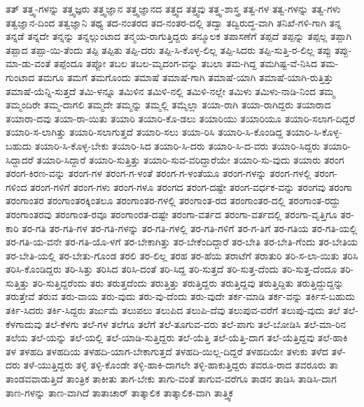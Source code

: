 {ತತ್
ತತ್ತ್ವ-ಗಳನ್ನು
ತತ್ತ್ವಜ್ಞರು
ತತ್ತ್ವಜ್ಞಾನ
ತತ್ತ್ವಜ್ಞಾನದ
ತತ್ತ್ವದ
ತತ್ತ್ವವು
ತತ್ತ್ವ-ಶಾಸ್ತ್ರ
ತತ್ವ-ಗಳ
ತತ್ವ-ಗಳನ್ನು
ತತ್ವ-ಗಳು
ತತ್ವಜ್ಞಾನ-ದಿಂದ
ತತ್ವಜ್ಞಾನಿ
ತಥ್ಯ
ತದ-ನಂತರದ
ತದ-ನಂತರ-ದಲ್ಲಿ
ತದ್ವಾ
ತದ್ವಿರುದ್ಧ-ವಾಗಿ
ತನಿಖೆ-ಗಳಿ-ಗಾಗಿ
ತನ್ನ
ತನ್ನಡೆ
ತನ್ನದೇ
ತನ್ನನ್ನು
ತನ್ನಲ್ಲುಂಟಾದ
ತನ್ಮಯ-ರಾಗುತ್ತಿದ್ದರು
ತನ್ಮೂಲಕ
ತಪಾಸಣೆಗೆ
ತಪ್ಪದೆ
ತಪ್ಪನ್ನು
ತಪ್ಪಲ್ಲ
ತಪ್ಪಾಗಿ
ತಪ್ಪಾದ
ತಪ್ಪಾ-ಯಿ-ತೆಂದು
ತಪ್ಪಿ
ತಪ್ಪಿತು
ತಪ್ಪಿ-ದರು
ತಪ್ಪಿ-ಸಿ-ಕೊಳ್ಳ-ಲಿಲ್ಲ
ತಪ್ಪಿ-ಸಿದರು
ತಪ್ಪಿ-ಸುತ್ತಿ-ರ-ಲಿಲ್ಲ
ತಪ್ಪು
ತಪ್ಪು-ಮಾ-ಡು-ವಂತೆ
ತಪ್ಪೆಂದೂ
ತಪ್ಪೋ
ತಬಲ
ತಬಲ-ಮೃದಂಗ-ವನ್ನು
ತಬಲಾ
ತಮ-ಗಿದ್ದ
ತಮಗಿಷ್ಟ-ವೆ-ನಿಸಿದ
ತಮ-ಗುಂಟಾದ
ತಮಗೂ
ತಮಗೆ
ತಮಗೊಂದು
ತಮಾಷೆ
ತಮಾಷೆ-ಗಾಗಿ
ತಮಾಷೆ-ಯಾಗಿ
ತಮಾಷೆ-ಯಾಗಿ-ರುತ್ತಿತ್ತು
ತಮಾಷೆ-ಯೆನ್ನಿ-ಸುತ್ತದೆ
ತಮಿ-ಳನ್ನೂ
ತಮಿಳಿನ
ತಮಿಳಿ-ನಲ್ಲಿ
ತಮಿಳಿ-ನಲ್ಲೇ
ತಮಿಳು
ತಮಿಳು-ನಾಡಿ-ನಿಂದ
ತಮ್ಮ
ತಮ್ಮಂದಿರೇ
ತಮ್ಮ-ದಾಗಲಿ
ತಮ್ಮದೇ
ತಮ್ಮನ್ನು
ತಮ್ಮಲ್ಲಿ
ತಮ್ಮೆಲ್ಲಾ
ತಯಾ-ರಾಗಿ
ತಯಾ-ರಾಗಿದ್ದರು
ತಯಾರಾದ
ತಯಾರಾ-ದವು
ತಯಾ-ರಾ-ಯಿತು
ತಯಾರಿ
ತಯಾರಿ-ಕೊ-ಡಲು
ತಯಾರಿಯು
ತಯಾರಿಯೂ
ತಯಾರಿ-ಸಲಾಗ-ದಿದ್ದರೆ
ತಯಾರಿ-ಸ-ಲಾಗಿತ್ತು
ತಯಾರಿ-ಸಲಾಗುತ್ತದೆ
ತಯಾರಿ-ಸಲು
ತಯಾ-ರಿಸಿ
ತಯಾರಿ-ಸಿ-ಕೊಂಡಿದ್ದ
ತಯಾರಿ-ಸಿ-ಕೊಳ್ಳ-ಬಹುದು
ತಯಾರಿ-ಸಿ-ಕೊಳ್ಳ-ಬೇಕು
ತಯಾರಿ-ಸಿದ
ತಯಾರಿ-ಸಿ-ದರು
ತಯಾರಿ-ಸಿ-ದ-ವರು
ತಯಾರಿ-ಸಿದ್ದರು
ತಯಾರಿ-ಸಿದ್ದಾದರೆ
ತಯಾರಿ-ಸಿದ್ದಾರೆ
ತಯಾರಿ-ಸುತ್ತಿತ್ತು
ತಯಾರಿ-ಸುವ-ವರಿದ್ದಾರೆಯೇ
ತಯಾರಿ-ಸು-ವುದು
ತಯಾರು
ತರಂಗ
ತರಂಗ-ಕಿರಣ-ವನ್ನು
ತರಂಗ-ಗಳ
ತರಂಗ-ಗ-ಳಂತೆ
ತರಂಗ-ಗ-ಳಂತೆಯೂ
ತರಂಗ-ಗಳನ್ನು
ತರಂಗ-ಗಳಲ್ಲಿ
ತರಂಗ-ಗಳಿಂದ
ತರಂಗ-ಗಳಿಗೆ
ತರಂಗ-ಗಳು
ತರಂಗ-ಗಳೂ
ತರಂಗದ
ತರಂಗ-ದಷ್ಟೇ
ತರಂಗ-ವರ್ಧಕ-ವನ್ನು
ತರಂಗವು
ತರಂಗಾ
ತರಂಗಾಂತರ
ತರಂಗಾಂತರಕ್ಕಿಂತಲೂ
ತರಂಗಾಂತರ-ಗಳಲ್ಲಿ
ತರಂಗಾಂತ-ರದ
ತರಂಗಾಂತರ-ದಲ್ಲಿ
ತರಂಗಾಂತ-ರದ್ದು
ತರಂಗಾಂತರವು
ತರಂಗಾಂತ-ರವೂ
ತರಂಗಾಂರತ-ದಷ್ಟೇ
ತರಂಗಾ-ವರ್ತದ
ತರಂಗಾ-ವರ್ತದಲ್ಲಿ
ತರಂಗಾ-ವೃತ್ತಿಗೂ
ತರ-ಕಾರಿ
ತರ-ಗತಿ
ತರ-ಗತಿ-ಗಳ
ತರ-ಗತಿ-ಗಳನ್ನು
ತರ-ಗತಿ-ಗಳಲ್ಲಿ
ತರ-ಗತಿ-ಗಳಿಗೆ
ತರ-ಗ-ತಿಗೆ
ತರ-ಗತಿಯ
ತರ-ಗತಿ-ಯಲ್ಲಿ
ತರ-ಗತಿ-ಯ-ವನೇ
ತರ-ಗತಿ-ಯೊ-ಳಗೆ
ತರ-ಬೇಕಾಗಿತ್ತು
ತರ-ಬೇಕೆಂದಿದ್ದಾರೆ
ತರ-ಬೇತಿ
ತರ-ಬೇತಿ-ಗೆಂದು
ತರ-ಬೇತಿಯ
ತರ-ಬೇತಿ-ಯಲ್ಲಿ
ತರ-ಬೇತು-ಗೊಂಡ
ತರಲಿ
ತರ-ಲಿಲ್ಲ
ತರಹ
ತರ-ಹೆಯ
ತರಾಟೆಗೆ
ತರಾತುರಿ
ತರಿ-ಸ-ಲಾ-ಯಿತು
ತರಿಸಿ
ತರಿಸಿ-ಕೊಂಡಿದ್ದರು
ತರಿ-ಸಿತ್ತು
ತರಿಸಿದ
ತರಿಸಿ-ದಂತೆ
ತರಿ-ಸಿದ್ದ
ತರಿ-ಸುತ್ತದೆ
ತರಿ-ಸುತ್ತ-ದೆಂದು
ತರಿ-ಸುತ್ತ-ದೆಂದೂ
ತರಿ-ಸುತ್ತಿತ್ತು
ತರಿ-ಸುತ್ತಿದ್ದರೆಂದು
ತರು
ತರುತ್ತದೆಂದು
ತರುತ್ತಿತ್ತು
ತರುತ್ತಿದ್ದರು
ತರುತ್ತಿದ್ದವು
ತರುತ್ತಿದ್ದಿತು
ತರುತ್ತಿದ್ದುದ್ದನ್ನು
ತರುತ್ತೇವೆ
ತರುವ
ತರು-ವಾಯ
ತರು-ವುದು
ತರು-ವು-ದೆಂದು
ತರು-ವುದೇ
ತರ್ಕ-ಮಾಡಿ
ತರ್ಕ-ವನ್ನು
ತರ್ಕಿಸ-ಬಹುದು
ತರ್ಕಿ-ಸಿದರು
ತರ್ಕಿ-ಸಿದ್ದರು
ತರ್ಜುಮೆ
ತಲುಪಲು
ತಲುಪಿದ
ತಲುಪಿ-ದೆವು
ತಲುಪುವ-ವರೆಗೆ
ತಲುಪು-ವುದು
ತಲೆ
ತಲೆ-ಕೆಳಗಾದುವು
ತಲೆ-ಕೆಳಗು
ತಲೆ-ಗಳ
ತಲೆಗೂ
ತಲೆಗೆ
ತಲೆ-ತೂಗುವ-ವರು
ತಲೆ-ಪಾಗು
ತಲೆ-ಬೋಡಿಸಿ
ತಲೆ-ಮಾ-ರಿನ
ತಲೆಯ
ತಲೆ-ಯನ್ನು
ತಲೆ-ಯಲ್ಲಿ
ತಲೆ-ಯಾಡಿ-ಸುತ್ತಿದ್ದರು
ತಲೆ-ಯೆತ್ತಿ
ತಲೆ-ಯೆತ್ತಿ-ದಾಗ
ತಲೆ-ಯೆತ್ತಿದ್ದವು
ತಲೆ-ಹಾಕಿ
ತಳ
ತಳಹದಿ
ತಳಹದಿಯ
ತಳಹದಿ-ಯಾಗ-ಬೇಕಾಗುತ್ತದೆ
ತಳಹದಿ-ಯಿಲ್ಲ-ದಿದ್ದರೆ
ತಳಹದಿಯೇ
ತಳುಕು
ತಳೆದ
ತಳೆ-ದರು
ತಳೆ-ಯುತ್ತಿದ್ದರು
ತಳ್ಳಿ
ತಳ್ಳಿ-ಕೊಂಡೇ
ತಳ್ಳಿ-ಹಾಕಿ-ದಾಗಲೇ
ತಳ್ಳಿ-ಹಾಕುತ್ತಿದ್ದರು
ತವರೂ-ರಾದ
ತವರೂರು
ತಾ
ತಾಂಡವವಾಡುತ್ತಿದೆ
ತಾಂತ್ರಿಕ
ತಾಕೀತು
ತಾಗ-ಬೇಕು
ತಾಗು-ವಂತೆ
ತಾಗುವ-ವರೆಗೂ
ತಾಡನ
ತಾಡಿಸಿ
ತಾಡಿಸಿ-ದಾಗ
ತಾಣ-ಗಳನ್ನು
ತಾಣ-ವಾಗಿದೆ
ತಾತಾಚಾರ್
ತಾತ್ಕಾಲಿಕ
ತಾತ್ಕಾಲಿಕ-ವಾಗಿ
ತಾತ್ತ್ವಿಕ
}
